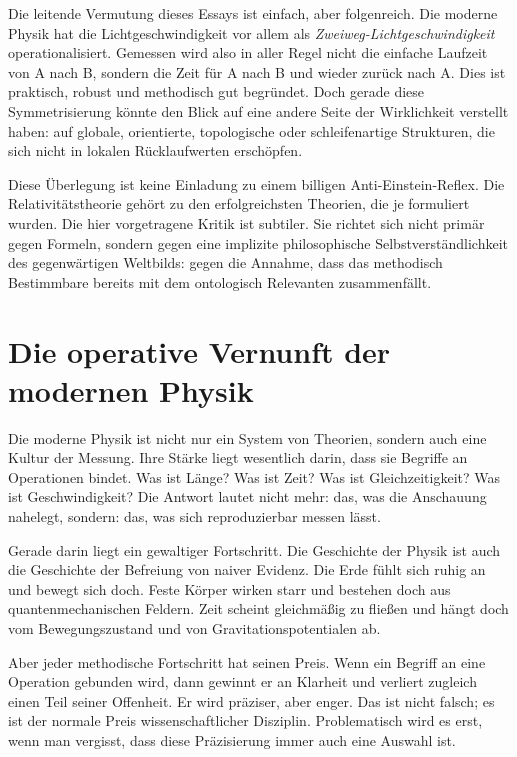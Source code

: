 \documentclass[11pt,a4paper]{article}
\theoremstyle{remark}
\begin{document}
	Die leitende Vermutung dieses Essays ist einfach, aber folgenreich. Die moderne Physik hat die Lichtgeschwindigkeit vor allem als \emph{Zweiweg-Lichtgeschwindigkeit} operationalisiert. Gemessen wird also in aller Regel nicht die einfache Laufzeit von A nach B, sondern die Zeit für A nach B und wieder zurück nach A. Dies ist praktisch, robust und methodisch gut begründet. Doch gerade diese Symmetrisierung könnte den Blick auf eine andere Seite der Wirklichkeit verstellt haben: auf globale, orientierte, topologische oder schleifenartige Strukturen, die sich nicht in lokalen Rücklaufwerten erschöpfen.
	
	Diese Überlegung ist keine Einladung zu einem billigen Anti-Einstein-Reflex. Die Relativitätstheorie gehört zu den erfolgreichsten Theorien, die je formuliert wurden. Die hier vorgetragene Kritik ist subtiler. Sie richtet sich nicht primär gegen Formeln, sondern gegen eine implizite philosophische Selbstverständlichkeit des gegenwärtigen Weltbilds: gegen die Annahme, dass das methodisch Bestimmbare bereits mit dem ontologisch Relevanten zusammenfällt.
	
	\section{Die operative Vernunft der modernen Physik}
	
	Die moderne Physik ist nicht nur ein System von Theorien, sondern auch eine Kultur der Messung. Ihre Stärke liegt wesentlich darin, dass sie Begriffe an Operationen bindet. Was ist Länge? Was ist Zeit? Was ist Gleichzeitigkeit? Was ist Geschwindigkeit? Die Antwort lautet nicht mehr: das, was die Anschauung nahelegt, sondern: das, was sich reproduzierbar messen lässt.
	
	Gerade darin liegt ein gewaltiger Fortschritt. Die Geschichte der Physik ist auch die Geschichte der Befreiung von naiver Evidenz. Die Erde fühlt sich ruhig an und bewegt sich doch. Feste Körper wirken starr und bestehen doch aus quantenmechanischen Feldern. Zeit scheint gleichmäßig zu fließen und hängt doch vom Bewegungszustand und von Gravitationspotentialen ab.
	
	Aber jeder methodische Fortschritt hat seinen Preis. Wenn ein Begriff an eine Operation gebunden wird, dann gewinnt er an Klarheit und verliert zugleich einen Teil seiner Offenheit. Er wird präziser, aber enger. Das ist nicht falsch; es ist der normale Preis wissenschaftlicher Disziplin. Problematisch wird es erst, wenn man vergisst, dass diese Präzisierung immer auch eine Auswahl ist.
	
\end{document}
